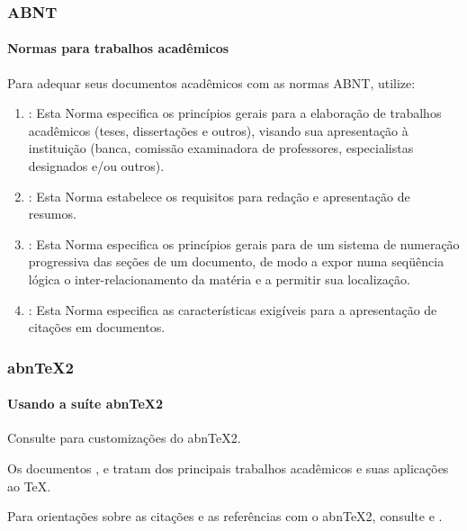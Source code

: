 \documentclass[aspectratio=1610]{beamer}
\begin{document}
\begin{frame}
\frametitle{ABNT}
\framesubtitle{Normas para trabalhos acadêmicos}

Para adequar seus documentos acadêmicos com as normas ABNT, utilize:
\begin{enumerate}
 \item {}: Esta Norma especifica os princípios gerais
 para a elaboração de trabalhos acadêmicos (teses, dissertações e outros),
 visando sua apresentação à instituição (banca, comissão examinadora de
 professores, especialistas designados e/ou outros).
 
 \item {}: Esta Norma estabelece os requisitos para
 redação e apresentação de resumos.
 
 \item {}: Esta Norma especifica os princípios gerais
 para de um sistema de numeração progressiva das seções de um documento, de
 modo a expor numa seqüência lógica o inter-relacionamento da matéria e a
 permitir sua localização.
 
 \item {}: Esta Norma especifica as características
 exigíveis para a apresentação de citações em documentos.
\end{enumerate}

\end{frame}

\begin{frame}
\frametitle{abnTeX2}
\framesubtitle{Usando a suíte abnTeX2}

Consulte  para customizações do abnTeX2.
\vspace{0.5cm}

Os documentos ,
 e  tratam dos
principais trabalhos acadêmicos e suas aplicações ao TeX.
\vspace{0.5cm}

Para orientações sobre as citações e as referências com o abnTeX2, consulte
 e .
\vspace{0.5cm}

\end{frame}

\end{document}
